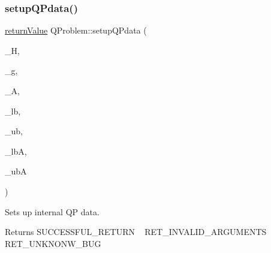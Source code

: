 \subsubsection{\texorpdfstring{setup\+Q\+Pdata()}{setupQPdata()}\hspace{0.1cm}{\footnotesize\ttfamily [1/2]}}
{\footnotesize\ttfamily \hyperlink{_message_handling_8hpp_a81d556f613bfbabd0b1f9488c0fa865e}{return\+Value} Q\+Problem\+::setup\+Q\+Pdata (\begin{DoxyParamCaption}\item[{\hyperlink{class_symmetric_matrix}{Symmetric\+Matrix} $\ast$}]{\+\_\+H,  }\item[{const \hyperlink{qp_o_a_s_e_s__wrapper_8h_a0d00e2b3dfadee81331bbb39068570c4}{real\+\_\+t} $\ast$const}]{\+\_\+g,  }\item[{\hyperlink{class_matrix}{Matrix} $\ast$}]{\+\_\+A,  }\item[{const \hyperlink{qp_o_a_s_e_s__wrapper_8h_a0d00e2b3dfadee81331bbb39068570c4}{real\+\_\+t} $\ast$const}]{\+\_\+lb,  }\item[{const \hyperlink{qp_o_a_s_e_s__wrapper_8h_a0d00e2b3dfadee81331bbb39068570c4}{real\+\_\+t} $\ast$const}]{\+\_\+ub,  }\item[{const \hyperlink{qp_o_a_s_e_s__wrapper_8h_a0d00e2b3dfadee81331bbb39068570c4}{real\+\_\+t} $\ast$const}]{\+\_\+lbA,  }\item[{const \hyperlink{qp_o_a_s_e_s__wrapper_8h_a0d00e2b3dfadee81331bbb39068570c4}{real\+\_\+t} $\ast$const}]{\+\_\+ubA }\end{DoxyParamCaption})\hspace{0.3cm}{\ttfamily [protected]}}

Sets up internal QP data. \begin{DoxyReturn}{Returns}
S\+U\+C\+C\+E\+S\+S\+F\+U\+L\+\_\+\+R\+E\+T\+U\+RN ~\newline
 R\+E\+T\+\_\+\+I\+N\+V\+A\+L\+I\+D\+\_\+\+A\+R\+G\+U\+M\+E\+N\+TS ~\newline
 R\+E\+T\+\_\+\+U\+N\+K\+N\+O\+N\+W\+\_\+\+B\+UG 
\end{DoxyReturn}

